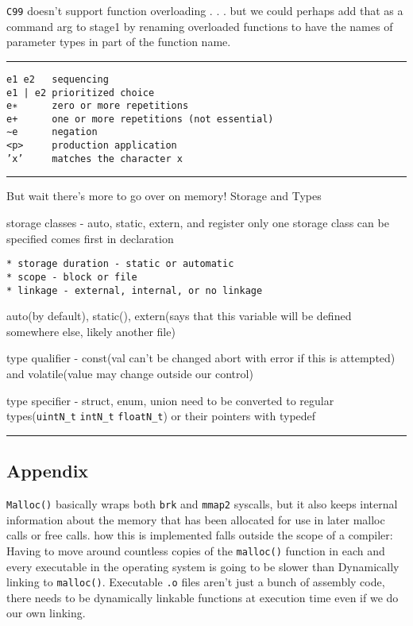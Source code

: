 \texttt{C99} doesn't support function overloading . . . but we could
perhaps add that as a command arg to stage1 by renaming overloaded
functions to have the names of parameter types in part of the function
name.

\begin{center}\rule{0.5\linewidth}{0.5pt}\end{center}

\begin{verbatim}
e1 e2   sequencing
e1 | e2 prioritized choice
e∗      zero or more repetitions
e+      one or more repetitions (not essential)
∼e      negation
<p>     production application
’x’     matches the character x
\end{verbatim}

\begin{center}\rule{0.5\linewidth}{0.5pt}\end{center}

But wait there's more to go over on memory! Storage and Types

storage classes - auto, static, extern, and register only one storage
class can be specified comes first in declaration

\begin{verbatim}
* storage duration - static or automatic
* scope - block or file
* linkage - external, internal, or no linkage
\end{verbatim}

auto(by default), static(), extern(says that this variable will be
defined somewhere else, likely another file)

type qualifier - const(val can't be changed abort with error if this is
attempted) and volatile(value may change outside our control)

type specifier - struct, enum, union need to be converted to regular
types(\texttt{uintN\_t} \texttt{intN\_t} \texttt{floatN\_t}) or their
pointers with typedef

\begin{center}\rule{0.5\linewidth}{0.5pt}\end{center}

\hypertarget{appendix}{%
\subsection{Appendix}\label{appendix}}

\texttt{Malloc()} basically wraps both \texttt{brk} and \texttt{mmap2}
syscalls, but it also keeps internal information about the memory that
has been allocated for use in later malloc calls or free calls. how this
is implemented falls outside the scope of a compiler: Having to move
around countless copies of the \texttt{malloc()} function in each and
every executable in the operating system is going to be slower than
Dynamically linking to \texttt{malloc()}. Executable \texttt{.o} files
aren't just a bunch of assembly code, there needs to be dynamically
linkable functions at execution time even if we do our own linking.

